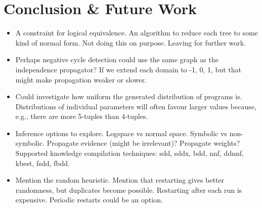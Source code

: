 \documentclass[runningheads]{llncs}
\begin{document}



\section{Conclusion \& Future Work}

\begin{itemize}
\item A constraint for logical equivalence. An algorithm to reduce each tree to
  some kind of normal form. Not doing this on purpose. Leaving for further work.
\item Perhaps negative cycle detection could use the same graph as the
  independence propagator? If we extend each domain to {-1, 0, 1}, but that
  might make propagation weaker or slower.
\item Could investigate how uniform the generated distribution of programs is.
  Distributions of individual parameters will often favour larger values
  because, e.g., there are more 5-tuples than 4-tuples.
\item Inference options to explore. Logspace vs normal space. Symbolic vs
  non-symbolic. Propagate evidence (might be irrelevant)? Propagate weights?
  Supported knowledge compilation techniques: sdd, sddx, bdd, nnf, ddnnf, kbest,
  fsdd, fbdd.
\item Mention the random heuristic. Mention that restarting gives better
  randomness, but duplicates become possible. Restarting after each run is
  expensive. Periodic restarts could be an option.
\end{itemize}
\end{document}
